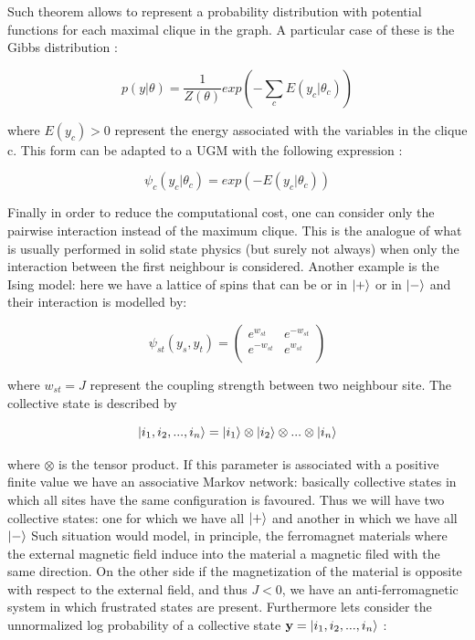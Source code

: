 \documentclass[12pt,%
               a4paper,%
               oneside,openany,%
               titlepage,%
               headinclude,footinclude,%
               BCOR5mm,%
               cleardoublepage=empty,%
               tablecaptionabove,%
               floatperchapter,
               ]{scrreprt}                 %
\begin{document}
Such theorem allows to represent a probability distribution with potential functions for each maximal clique in the graph.  A particular case of these is the Gibbs distribution \cite{murphy2012machine}: 

\begin{equation}
p(y|\theta)=\dfrac{1}{Z(\theta)} exp\left(-\sum_{c}E(y_{c}|\theta_{c})\right)
\end{equation}

where $E(y_{c})>0$ represent the energy associated with the variables in the clique c.  This form can be adapted to a UGM with the following expression \cite{murphy2012machine}:

\begin{equation}
\psi_{c}(y_{c}|\theta_{c})=exp\left(-E(y_{c}|\theta_{c})\right)
\end{equation}

Finally in order to reduce the computational cost,  one can consider only the pairwise interaction instead of the maximum clique. This is the analogue of what is usually performed in solid state physics (but surely not always)  when only the interaction between the first neighbour is considered.  Another example is the  Ising model: here we have a lattice of spins that can be or in $\ket{+}$ or in $\ket{-}$ and their interaction is modelled by\cite{murphy2012machine}:


\begin{equation}
\psi_{st}\left(y_{s},y_{t}\right) =
\begin{pmatrix}
e^{w_{st}} & e^{-w_{st}} \\
e^{-w_{st}} & e^{w_{st}} \\
\end{pmatrix}
\end{equation}

where $w_{st}=J$ represent the coupling strength between two neighbour site.  The collective state is described by 

\begin{equation}
\ket{i_{1},i_{2},...,i_{n}}=\ket{i_{1}}\otimes\ket{i_{2}}\otimes...\otimes\ket{i_{n}}
\end{equation}

where $\otimes$ is the tensor product.  If this parameter is associated with a positive finite value we have an associative Markov network: basically collective states in which all sites have the same configuration is favoured. Thus we will have two collective states: one for which we have all $\ket{+}$ and another in which we have all $\ket{-}$  Such situation would model,  in principle,  the ferromagnet materials where the external magnetic field induce into the material a magnetic filed with the same direction.  On the other side if the magnetization of the material is opposite with respect to the external field,  and thus $J<0$,  we have an anti-ferromagnetic system in which frustrated states are present.  Furthermore lets consider the unnormalized log probability of a collective state $\textbf{y}=\ket{i_{1},i_{2},...,i_{n}}$ \cite{murphy2012machine}:
\end{document}

